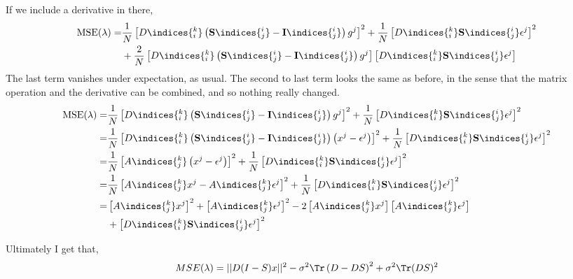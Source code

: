 \documentclass[11pt]{article}
\begin{document}
If we include a derivative in there,
\begin{align}
    \textrm{MSE}(\lambda) =& \frac{1}{N} \left[ D\indices{^k_i} \left(\mathbf{S}\indices{^i_j} -\mathbf{I}\indices{^i_j} \right) g^j  \right]^2  + \frac{1}{N} \left[ D\indices{^k_i} \mathbf{S}\indices{^i_j} \epsilon^j \right]^2\\
    & +\frac{2}{N} \left[ D\indices{^k_i} \left(\mathbf{S}\indices{^i_j} -\mathbf{I}\indices{^i_j} \right) g^j  \right] \left[ D\indices{^k_i} \mathbf{S}\indices{^i_j} \epsilon^j \right]
\end{align}
The last term vanishes under expectation, as usual. The second to last term looks the same as before, in the sense that the matrix operation and the derivative can be combined, and so nothing really changed.
\begin{align}
    \textrm{MSE}(\lambda) =& \frac{1}{N} \left[ D\indices{^k_i} \left(\mathbf{S}\indices{^i_j} -\mathbf{I}\indices{^i_j} \right) g^j  \right]^2  + \frac{1}{N} \left[ D\indices{^k_i} \mathbf{S}\indices{^i_j} \epsilon^j \right]^2 \\ \nonumber
    =& \frac{1}{N} \left[ D\indices{^k_i} \left(\mathbf{S}\indices{^i_j} -\mathbf{I}\indices{^i_j} \right) \left(x^j-\epsilon^j\right)  \right]^2  + \frac{1}{N} \left[ D\indices{^k_i} \mathbf{S}\indices{^i_j} \epsilon^j \right]^2\\
    =& \frac{1}{N}\left[ A\indices{^k_j} \left(x^j-\epsilon^j\right) \right]^2 + \frac{1}{N} \left[ D\indices{^k_i} \mathbf{S}\indices{^i_j} \epsilon^j \right]^2 \\
    =& \frac{1}{N}\left[ A\indices{^k_j} x^j-A\indices{^k_j}\epsilon^j \right]^2 + \frac{1}{N} \left[ D\indices{^k_i} \mathbf{S}\indices{^i_j} \epsilon^j \right]^2 \\
    =& \left[ A\indices{^k_j} x^j\right]^2 + \left[ A\indices{^k_j}\epsilon^j \right]^2 - 2 \left[ A\indices{^k_j} x^j\right]\left[ A\indices{^k_j}\epsilon^j \right] \\ \nonumber
    & +  \left[ D\indices{^k_i} \mathbf{S}\indices{^i_j} \epsilon^j \right]^2
\end{align}

Ultimately I get that,
\begin{equation}
    MSE(\lambda) = || D(I-S)x ||^2 - \sigma^2 \Tr \left(D - DS \right)^2 + \sigma^2 \Tr (DS)^2 
\end{equation}
\end{document}

